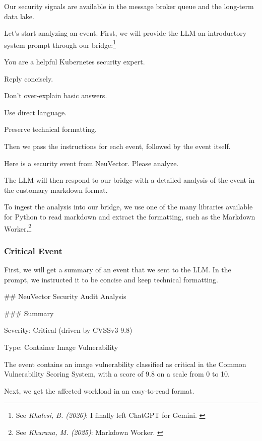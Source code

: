 Our security signals are available in the message broker queue and the long-term data lake.

Let's start analyzing an event. First, we will provide the LLM an introductory system prompt through our bridge:\footnote{See \textit{Khalesi, B. (2026)}: I finally left ChatGPT for Gemini. \cite{toGemini}}

\indent\colorbox{codegrey}{
    \parbox{0.8\linewidth}{
You are a helpful Kubernetes security expert.
        
Reply concisely.

Don't over-explain basic answers.
        
Use direct language.
        
Preserve technical formatting.
    }
}

Then we pass the instructions for each event, followed by the event itself.

\indent\colorbox{codegrey}{
    \parbox{0.8\linewidth}{
Here is a security event from NeuVector. Please analyze.
     }
}

The LLM will then respond to our bridge with a detailed analysis of the event in the customary markdown format.

To ingest the analysis into our bridge, we use one of the many libraries available for Python to read markdown and extract the formatting, such as the Markdown Worker.\footnote{See \textit{Khurana, M. (2025)}: Markdown Worker. \cite{markdownWorker}}

\subsubsection{Critical Event}

First, we will get a summary of an event that we sent to the LLM. In the prompt, we instructed it to be concise and keep technical formatting.

\indent\colorbox{codegrey}{
    \parbox{0.8\linewidth}{
\#\# NeuVector Security Audit Analysis
    }
}

\indent\colorbox{codegrey}{
    \parbox{0.8\linewidth}{
\#\#\# Summary

Severity: Critical (driven by CVSSv3 9.8)

Type: Container Image Vulnerability
     }
}

The event contains an image vulnerability classified as critical in the Common Vulnerability Scoring System, with a score of 9.8 on a scale from 0 to 10.

Next, we get the affected workload in an easy-to-read format.

